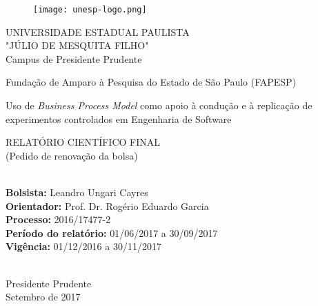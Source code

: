 \newpage
\begin{figure}[!htp]
  \texttt{[image: unesp-logo.png]}  %
\end{figure}

\hspace*{73mm}
\begin{minipage}{79mm}
	\vskip-35mm
	\begin{center}
		UNIVERSIDADE ESTADUAL PAULISTA \\[-2mm] "JÚLIO DE MESQUITA FILHO" \\[-2mm] Campus de Presidente Prudente
	\end{center}
\end{minipage}
\begin{center}
	{\large Fundação de Amparo à Pesquisa do Estado de São Paulo (FAPESP)  }
\end{center} 
\vspace*{30mm}
\begin{center}
	{\large Uso de \textit{Business Process Model} como apoio à condução e à replicação de experimentos controlados em Engenharia de Software 
  }
\end{center}

\vspace*{15mm}

\begin{center}
	{\large RELATÓRIO CIENTÍFICO FINAL \\ (Pedido de renovação da bolsa)  }\\
\end{center}



{\flushleft
	{\normalsize
		\vspace{30mm}
		\hrulefill\\
		\hspace{10mm} \textbf{Bolsista: }Leandro Ungari Cayres\\
		\hspace{10mm} \textbf{Orientador: }Prof. Dr. Rogério Eduardo Garcia\\
		\hspace{10mm} \textbf{Processo: }2016/17477-2\\
		\hspace{10mm} \textbf{Período do relatório: }01/06/2017 a 30/09/2017\\
		\hspace{10mm} \textbf{Vigência: }01/12/2016 a 30/11/2017 \\
		\hrulefill\\
	}
}

\vspace*{\fill}

\begin{center}
	Presidente Prudente \\Setembro de 2017  %
\end{center}